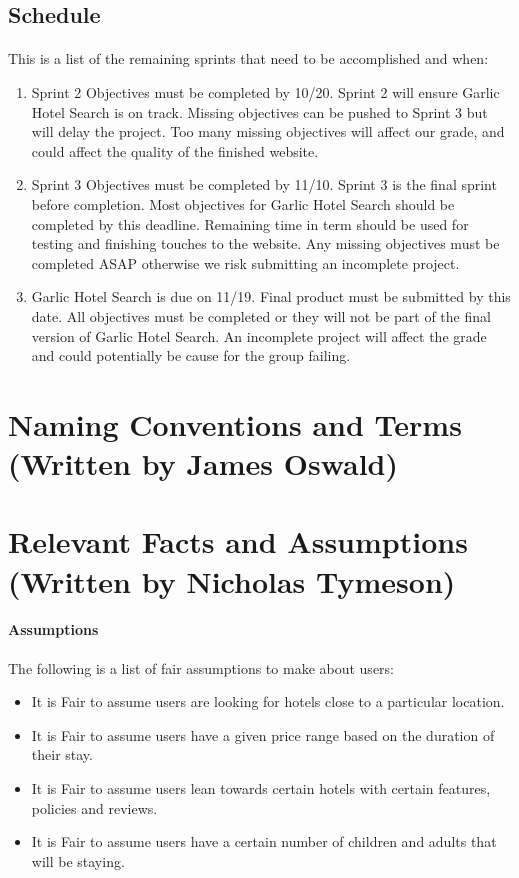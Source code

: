 \documentclass[]{article}
\begin{document}
\subsection{Schedule}
\paragraph{}
This is a list of the remaining sprints that need to be accomplished and when:

\begin{enumerate}
    \item Sprint 2 Objectives must be completed by 10/20. Sprint 2 will ensure Garlic Hotel Search is on track. Missing objectives can be pushed to Sprint 3 but will delay the project. Too many missing objectives will affect our grade, and could affect the quality of the finished website. 
    \item Sprint 3 Objectives must be completed by 11/10. Sprint 3 is the final sprint before completion. Most objectives for Garlic Hotel Search should be completed by this deadline. Remaining time in term should be used for testing and finishing touches to the website. Any missing objectives must be completed ASAP otherwise we risk submitting an incomplete project.
    \item Garlic Hotel Search is due on 11/19. Final product must be submitted by this date. All objectives must be completed or they will not be part of the final version of Garlic Hotel Search. An incomplete project will affect the grade and could potentially be cause for the group failing.
\end{enumerate}

\section{Naming Conventions and Terms (Written by James Oswald)}

\section{Relevant Facts and Assumptions (Written by Nicholas Tymeson)}
\paragraph{Assumptions}
The following is a list of fair assumptions to make about users:
\begin{itemize}
    \item It is Fair to assume users are looking for hotels close to a particular location.
    \item It is Fair to assume users have a given price range based on the duration of their stay.
    \item It is Fair to assume users lean towards certain hotels with certain features, policies and reviews.
    \item It is Fair to assume users have a certain number of children and adults that will be staying.
\end{itemize}
  
\end{document}
